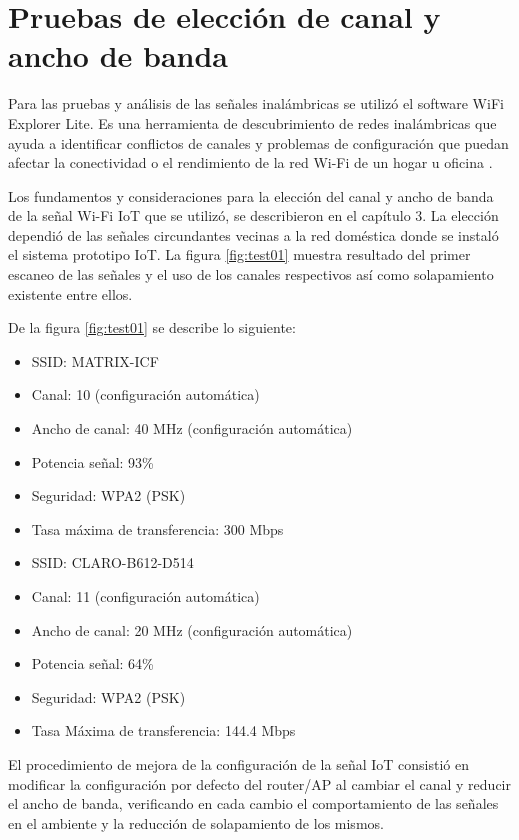 \section{Pruebas de elección de canal y ancho de banda}
Para las pruebas y análisis de las señales inalámbricas se utilizó el software WiFi Explorer Lite. Es una herramienta de descubrimiento de redes inalámbricas que ayuda a identificar conflictos de canales y problemas de configuración que puedan afectar la conectividad o el rendimiento de la red Wi-Fi de un hogar u oficina \citep{WEBSITE:24}. 

Los fundamentos y consideraciones para la elección del canal y ancho de banda de la señal Wi-Fi IoT que se utilizó, se describieron en el capítulo 3. La elección dependió de las señales circundantes vecinas a la red doméstica donde se instaló el sistema prototipo IoT. La figura \ref{fig:test01} muestra resultado del primer escaneo de las señales y el uso de los canales respectivos así como solapamiento existente entre ellos. 

De la figura \ref{fig:test01} se describe lo siguiente:

\begin{itemize}
\item SSID: MATRIX-ICF
\item Canal: 10 (configuración automática)
\item Ancho de canal: 40 MHz (configuración automática)
\item Potencia señal: 93\%
\item Seguridad:  WPA2 (PSK)
\item Tasa máxima de transferencia: 300 Mbps
\end{itemize}


\begin{itemize} 
\item SSID: CLARO-B612-D514
\item Canal: 11 (configuración automática)
\item Ancho de canal: 20 MHz (configuración automática)
\item Potencia señal: 64\%
\item Seguridad: WPA2 (PSK)
\item Tasa Máxima de transferencia: 144.4 Mbps
\end{itemize}

El procedimiento de mejora de la configuración de la señal IoT consistió en modificar la configuración por defecto del router/AP al cambiar el canal y reducir el ancho de banda, verificando en cada cambio el comportamiento de las señales en el ambiente y la reducción de solapamiento de los mismos.

